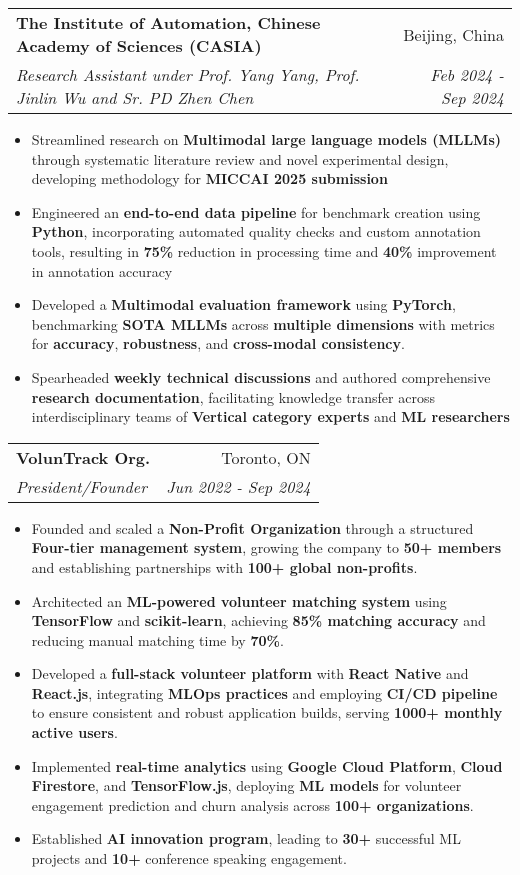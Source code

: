 \documentclass[letterpaper,10pt]{article}
\makeatletter
\newcommand{\resumeItem}[1]{
  \item\small{
    {#1 \vspace{-5pt}}
  }
}
\newcommand{\resumeSubheading}[4]{
  \vspace{-2pt}\item
    \begin{tabular*}{0.97\textwidth}[t]{l@{\extracolsep{\fill}}r}
      \textbf{#1} & #2 \\
      \textit{\small#3} & \textit{\small #4} \\
    \end{tabular*}\vspace{-7pt}
}
\newcommand{\resumeItemListStart}{\begin{itemize}}
\newcommand{\resumeItemListEnd}{\end{itemize}\vspace{-5pt}}
\makeatother
\begin{document}
\resumeSubheading
{The Institute of Automation, Chinese Academy of Sciences (CASIA)}{Beijing, China}
{Research Assistant under Prof. Yang Yang, Prof. Jinlin Wu and Sr. PD Zhen Chen}{Feb 2024 - Sep 2024}
\resumeItemListStart
\resumeItem{Streamlined research on \textbf{Multimodal large language models (MLLMs)} through systematic literature review and novel experimental design, developing methodology for \textbf{MICCAI 2025 submission}}
\resumeItem{Engineered an \textbf{end-to-end data pipeline} for benchmark creation using \textbf{Python}, incorporating automated quality checks and custom annotation tools, resulting in \textbf{75\%} reduction in processing time and \textbf{40\%} improvement in annotation accuracy}
\resumeItem{Developed a \textbf{Multimodal evaluation framework} using \textbf{PyTorch}, benchmarking \textbf{SOTA MLLMs} across \textbf{multiple dimensions} with metrics for \textbf{accuracy}, \textbf{robustness}, and \textbf{cross-modal consistency}.}
\resumeItem{Spearheaded \textbf{weekly technical discussions} and authored comprehensive \textbf{research documentation}, facilitating knowledge transfer across interdisciplinary teams of \textbf{Vertical category experts} and \textbf{ML researchers}}
\resumeItemListEnd

\resumeSubheading
{VolunTrack Org.}{Toronto, ON}
{President/Founder}{Jun 2022 - Sep 2024}
\resumeItemListStart
\resumeItem{Founded and scaled a \textbf{Non-Profit Organization} through a structured \textbf{Four-tier management system}, growing the company to \textbf{50+ members} and establishing partnerships with \textbf{100+ global non-profits}.}
\resumeItem{Architected an \textbf{ML-powered volunteer matching system} using \textbf{TensorFlow} and \textbf{scikit-learn}, achieving \textbf{85\% matching accuracy} and reducing manual matching time by \textbf{70\%}.}
\resumeItem{Developed a \textbf{full-stack volunteer platform} with \textbf{React Native} and \textbf{React.js}, integrating \textbf{MLOps practices} and employing \textbf{CI/CD pipeline} to ensure consistent and robust application builds, serving \textbf{1000+ monthly active users}.}
\resumeItem{Implemented \textbf{real-time analytics} using \textbf{Google Cloud Platform}, \textbf{Cloud Firestore}, and \textbf{TensorFlow.js}, deploying \textbf{ML models} for volunteer engagement prediction and churn analysis across \textbf{100+ organizations}.}
\resumeItem{Established \textbf{AI innovation program}, leading to \textbf{30+} successful ML projects and \textbf{10+} conference speaking engagement.}
\resumeItemListEnd
\end{document}
